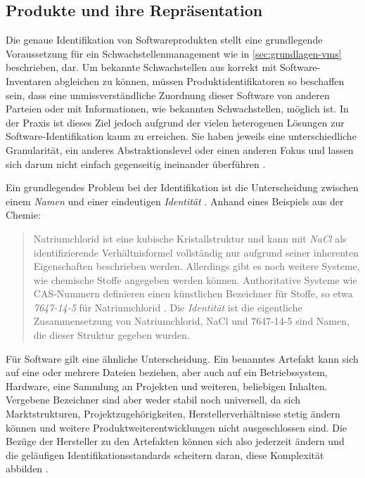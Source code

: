 \subsection{Produkte und ihre Repräsentation}\label{subsec:produkte-vs-reprasentation}

Die genaue Identifikation von Softwareprodukten stellt eine grundlegende Voraussetzung für ein Schwachstellenmanagement wie in \autoref{sec:grundlagen-vms} beschrieben, dar.
Um bekannte Schwachstellen aus  korrekt mit Software-Inventaren abgleichen zu können, müssen Produktidentifikatoren so beschaffen sein, dass eine unmissverständliche Zuordnung dieser Software von anderen Parteien oder mit Informationen, wie bekannten Schwachstellen, möglich ist.
In der Praxis ist dieses Ziel jedoch aufgrund der vielen heterogenen Lösungen zur Software-Identifikation kaum zu erreichen.
Sie haben jeweils eine unterschiedliche Granularität, ein anderes Abstraktionslevel oder einen anderen Fokus und lassen sich darum nicht einfach gegenseitig ineinander überführen \autocite{CISA2023}.

Ein grundlegendes Problem bei der Identifikation ist die Unterscheidung zwischen einem \textit{Namen} und einer eindeutigen \textit{Identität} \autocite{Manion_Proell_Schmidt2023}.
Anhand eines Beispiels aus der Chemie:

\begin{quote}
    Natriumchlorid ist eine kubische Kristallstruktur und kann mit \textit{NaCl} als identifizierende Verhältnisformel vollständig nur aufgrund seiner inherenten Eigenschaften beschrieben werden.
    Allerdings gibt es noch weitere Systeme, wie chemische Stoffe angegeben werden können.
    Authoritative Systeme wie CAS-Nummern definieren einen künstlichen Bezeichner für Stoffe, so etwa \textit{7647-14-5} für Natriumchlorid \autocite{Huebner_2003}.
    Die \textit{Identität} ist die eigentliche Zusammensetzung von Natriumchlorid, NaCl und 7647-14-5 sind Namen, die dieser Struktur gegeben wurden.
\end{quote}

Für Software gilt eine ähnliche Unterscheidung.
Ein benanntes Artefakt kann sich auf eine oder mehrere Dateien beziehen, aber auch auf ein Betriebssystem, Hardware, eine Sammlung an Projekten und weiteren, beliebigen Inhalten.
Vergebene Bezeichner sind aber weder stabil noch universell, da sich Marktstrukturen, Projektzugehörigkeiten, Herstellerverhältnisse stetig ändern können und weitere Produktweiterentwicklungen nicht ausgeschlossen sind.
Die Bezüge der Hersteller zu den Artefakten können sich also jederzeit ändern und die geläufigen Identifikationsstandards scheitern daran, diese Komplexität abbilden \autocite{Manion_Proell_Schmidt2023}.

